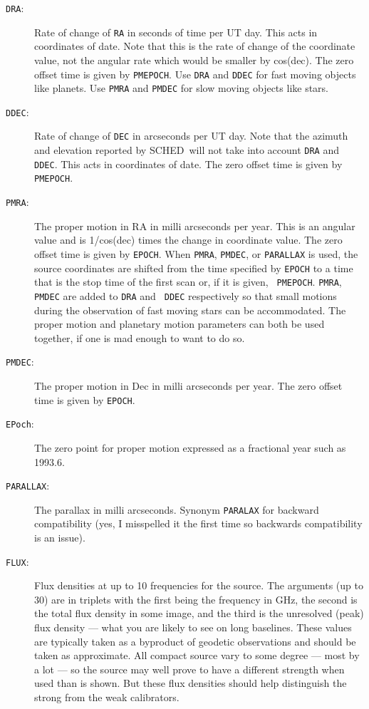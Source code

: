 \documentclass{report}
\newcommand{\schedb}{{\sc SCHED~}}
\begin{document}
\begin{description}
\item [{\tt DRA}:] Rate of change of {\tt RA} in seconds of time per
UT day.  This acts in coordinates of date.  Note that this is the
rate of change of the coordinate value, not the angular rate which
would be smaller by cos(dec).  The zero offset time is given by
{\tt PMEPOCH}.  Use {\tt DRA} and {\tt DDEC} for fast moving objects
like planets.  Use {\tt PMRA} and {\tt PMDEC} for slow moving
objects like stars.

\item [{\tt DDEC}:] Rate of change of {\tt DEC} in arcseconds per UT
day. Note that the azimuth and elevation reported by \schedb will not
take into account {\tt DRA} and {\tt DDEC}. This acts in coordinates
of date.  The zero offset time is given by {\tt PMEPOCH}.

\item [{\tt PMRA}:] The proper motion in RA in milli arcseconds per year.
This is an angular value and is 1/cos(dec) times the change in
coordinate value.  The zero offset time is given by {\tt EPOCH}.  When
{\tt PMRA}, {\tt PMDEC}, or {\tt PARALLAX} is used, the source
coordinates are shifted from the time specified by {\tt EPOCH} to a
time that is the stop time of the first scan or, if it is given, {\tt
PMEPOCH}.  {\tt PMRA}, {\tt PMDEC} are added to {\tt DRA} and {\tt
DDEC} respectively so that small motions during the observation of
fast moving stars can be accommodated.  The proper motion and planetary
motion parameters can both be used together, if one is mad enough
to want to do so.

\item [{\tt PMDEC}:] The proper motion in Dec in milli arcseconds per year.
The zero offset time is given by {\tt EPOCH}.

\item [{\tt EPoch}:] The zero point for proper motion expressed as
a fractional year such as 1993.6.

\item [{\tt PARALLAX}:] The parallax in milli arcseconds.  Synonym
{\tt PARALAX} for backward compatibility (yes, I misspelled it the first
time so backwards compatibility is an issue).

\item [{\tt FLUX}:] Flux densities at up to 10 frequencies for the
source.  The arguments (up to 30) are in triplets with the first being
the frequency in GHz, the second is the total flux density in some
image, and the third is the unresolved (peak) flux density --- what
you are likely to see on long baselines.  These values are typically
taken as a byproduct of geodetic observations and should be taken as
approximate.  All compact source vary to some degree --- most by a lot
--- so the source may well prove to have a different strength when
used than is shown.  But these flux densities should help distinguish
the strong from the weak calibrators.


\end{description}
\end{document}
